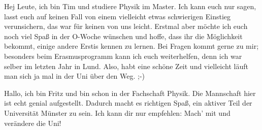 \begin{multicols}{2}
{
Hej Leute, ich bin Tim und studiere Physik im Master. Ich kann euch nur sagen, lasst euch auf keinen Fall von einem vielleicht etwas schwierigen Einstieg verunsichern, das war für keinen von uns leicht. 
Erstmal aber möchte ich euch noch viel Spaß in der O-Woche wünschen und hoffe, dass ihr die Möglichkeit bekommt, einige andere Erstis kennen zu lernen. 
Bei Fragen kommt gerne zu mir; besonders beim Erasmusprogramm kann ich euch weiterhelfen, denn ich war selber im letzten Jahr in Lund. Also, habt eine schöne Zeit und vielleicht läuft man sich ja mal in der Uni über den Weg. ;-)
}



%
%
%
%

\vspace{6ex}

{
Hallo, ich bin Fritz und bin schon  in der Fachschaft Physik.
Die Mannschaft hier ist echt genial aufgestellt. Dadurch macht es richtigen Spaß, ein aktiver Teil der Universität Münster zu sein.
Ich kann dir nur empfehlen: Mach' mit und verändere die Uni!
}


\end{multicols}

\vspace{20ex}
